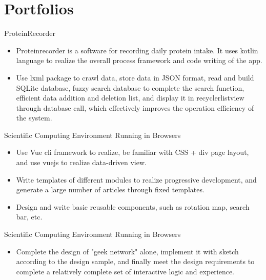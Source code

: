 \documentclass{resume}
\newcommand{\en}[1]{#1}
\newcommand{\zh}[1]{}
\begin{document}
\section{\en{Portfolios}\zh{个人项目}}
\en{ProteinRecorder}
\zh{ProteinRecorder}
\begin{itemize}
      \item \en{Proteinrecorder is a software for recording daily protein intake. It uses kotlin language to realize the overall process framework and code writing of the app.}
            \zh{ProteinRecorder 是记录日常蛋白质摄入量的软件，用Kotlin语言实现app的整体流程框架和代码编写。}
      \item \en{Use lxml package to crawl data, store data in JSON format, read and build SQLite database, fuzzy search database to complete the search function, efficient data addition and deletion list, and display it in recyclerlistview through database call, which effectively improves the operation efficiency of the system.}
            \zh{使用 lxml 包爬取数据，json格式存储数据，读取并构建SQLite数据库，模糊搜索数据库以完成搜索功能， 高效的数据添加和删除列表，通过数据库的调用显示到RecyclerListView中，有效的提升了系统的运行效率。}
\end{itemize}

\en{Scientific Computing Environment Running in Browsers}
\zh{少数民族 Web 前端项目}
\begin{itemize}
      \item \en{Use Vue cli framework to realize, be familiar with CSS + div page layout, and use vuejs to realize data-driven view.}
            \zh{使用vue-cli框架来实现，熟悉CSS+DIV页面布局，用Vuejs实现数据驱动视图。}
      \item \en{Write templates of different modules to realize progressive development, and generate a large number of articles through fixed templates.}
            \zh{编写不同模块的template来实现渐进式开发，通过固定模板实现大量文章的生成。}
      \item \en{Design and write basic reusable components, such as rotation map, search bar, etc.}
            \zh{设计并编写基础可复用的组件，如轮播图，搜索栏等。}
\end{itemize}

\en{Scientific Computing Environment Running in Browsers}
\zh{极客网”交互设计方案}
\begin{itemize}
      \item \en{Complete the design of "geek network" alone, implement it with sketch according to the design sample, and finally meet the design requirements to complete a relatively complete set of interactive logic and experience.}
            \zh{独自完成”极客网”的设计，并按照设计样稿，采用Sketch进行实现，最终符合设计要求完成一套比较 完整的交互逻辑和体验。}
\end{itemize}
\end{document}

